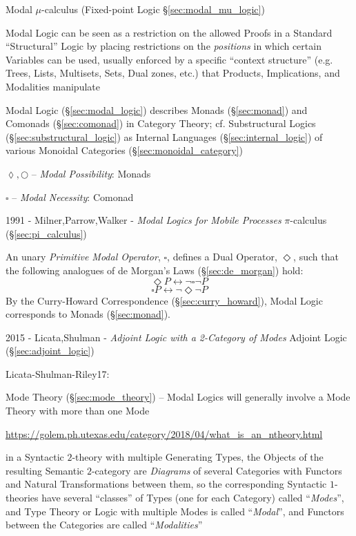 \fist Modal $\mu$-calculus (Fixed-point Logic
\S\ref{sec:modal_mu_logic})

Modal Logic can be seen as a restriction on the allowed Proofs in a
Standard ``Structural'' Logic by placing restrictions on the
\emph{positions} in which certain Variables can be used, usually
enforced by a specific ``context structure'' (e.g. Trees, Lists,
Multisets, Sets, Dual zones, etc.) that Products, Implications, and
Modalities manipulate

Modal Logic (\S\ref{sec:modal_logic}) describes Monads
(\S\ref{sec:monad}) and Comonads (\S\ref{sec:comonad}) in Category
Theory; cf. Substructural Logics (\S\ref{sec:substructural_logic}) as
Internal Languages (\S\ref{sec:internal_logic}) of various Monoidal
Categories (\S\ref{sec:monoidal_category})

$\lozenge, \bigcirc$ -- \emph{Modal Possibility}: Monads

$\square$ -- \emph{Modal Necessity}: Comonad

1991 - Milner,Parrow,Walker - \emph{Modal Logics for Mobile Processes} \fist
$\pi$-calculus (\S\ref{sec:pi_calculus})

\asterism

An unary \emph{Primitive Modal Operator}, $\square$, defines a Dual
Operator, $\Diamond$, such that the following analogues of de Morgan's
Laws (\S\ref{sec:de_morgan}) hold:
\[
  \Diamond P \leftrightarrow \neg \square \neg P
\]
\[
  \square P \leftrightarrow \neg \Diamond \neg P
\]
By the Curry-Howard Correspondence (\S\ref{sec:curry_howard}), Modal
Logic corresponds to Monads (\S\ref{sec:monad}).

\asterism

2015 - Licata,Shulman - \emph{Adjoint Logic with a 2-Category of Modes} \fist
Adjoint Logic (\S\ref{sec:adjoint_logic})

Licata-Shulman-Riley17:

\fist Mode Theory (\S\ref{sec:mode_theory}) -- Modal Logics will generally
involve a Mode Theory with more than one Mode

\url{https://golem.ph.utexas.edu/category/2018/04/what_is_an_ntheory.html}

in a Syntactic $2$-theory with multiple Generating Types, the Objects of the
resulting Semantic $2$-category are \emph{Diagrams} of several Categories with
Functors and Natural Transformations between them, so the corresponding
Syntactic $1$-theories have several ``classes'' of Types (one for each
Category) called ``\emph{Modes}'', and Type Theory or Logic with multiple Modes
is called ``\emph{Modal}'', and Functors between the Categories are called
``\emph{Modalities}''

